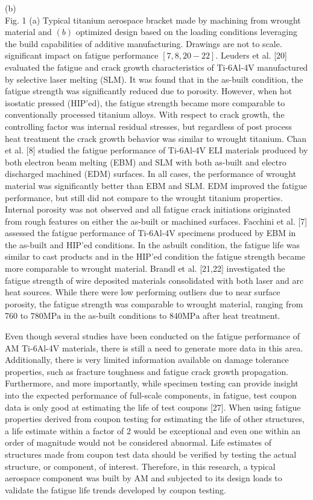 \documentclass[10pt]{article}
\begin{document}
(b)\\
Fig. 1 (a) Typical titanium aerospace bracket made by machining from wrought material and $(b)$ optimized design based on the loading conditions leveraging the build capabilities of additive manufacturing. Drawings are not to scale.\\
significant impact on fatigue performance $[7,8,20-22]$. Leuders et al. [20] evaluated the fatigue and crack growth characteristics of Ti-6Al-4V manufactured by selective laser melting (SLM). It was found that in the as-built condition, the fatigue strength was significantly reduced due to porosity. However, when hot isostatic pressed (HIP'ed), the fatigue strength became more comparable to conventionally processed titanium alloys. With respect to crack growth, the controlling factor was internal residual stresses, but regardless of post process heat treatment the crack growth behavior was similar to wrought titanium. Chan et al. [8] studied the fatigue performance of Ti-6Al-4V ELI materials produced by both electron beam melting (EBM) and SLM with both as-built and electro discharged machined (EDM) surfaces. In all cases, the performance of wrought material was significantly better than EBM and SLM. EDM improved the fatigue performance, but still did not compare to the wrought titanium properties. Internal porosity was not observed and all fatigue crack initiations originated from rough features on either the as-built or machined surfaces. Facchini et al. [7] assessed the fatigue performance of Ti-6Al-4V specimens produced by EBM in the as-built and HIP'ed conditions. In the asbuilt condition, the fatigue life was similar to cast products and in the HIP'ed condition the fatigue strength became more comparable to wrought material. Brandl et al. [21,22] investigated the fatigue strength of wire deposited materials consolidated with both laser and arc heat sources. While there were low performing outliers due to near surface porosity, the fatigue strength was comparable to wrought material, ranging from 760 to $780 \mathrm{MPa}$ in the as-built conditions to $840 \mathrm{MPa}$ after heat treatment.

Even though several studies have been conducted on the fatigue performance of AM Ti-6Al-4V materials, there is still a need to generate more data in this area. Additionally, there is very limited information available on damage tolerance properties, such as fracture toughness and fatigue crack growth propagation. Furthermore, and more importantly, while specimen testing can provide insight into the expected performance of full-scale components, in fatigue, test coupon data is only good at estimating the life of test coupons [27]. When using fatigue properties derived from coupon testing for estimating the life of other structures, a life estimate within a factor of 2 would be exceptional and even one within an order of magnitude would not be considered abnormal. Life estimates of structures made from coupon test data should be verified by testing the actual structure, or component, of interest. Therefore, in this research, a typical aerospace component was built by AM and subjected to its design loads to validate the fatigue life trends developed by coupon testing.
\end{document}
